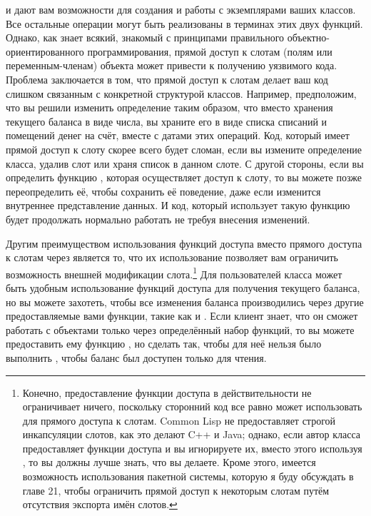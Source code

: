  и  дают вам возможности для создания и работы с
экземплярами ваших классов.  Все остальные операции могут быть реализованы в терминах этих
двух функций.  Однако, как знает всякий, знакомый с принципами правильного
объектно-ориентированного программирования, прямой доступ к слотам (полям или
переменным-членам) объекта может привести к получению уязвимого кода.  Проблема
заключается в том, что прямой доступ к слотам делает ваш код слишком связанным с
конкретной структурой классов.  Например, предположим, что вы решили изменить определение
 таким образом, что вместо хранения текущего баланса в виде числа, вы
храните его в виде списка списаний и помещений денег на счёт, вместе с датами этих
операций.  Код, который имеет прямой доступ к слоту  скорее всего будет
сломан, если вы измените определение класса, удалив слот или храня список в данном
слоте. С другой стороны, если вы определить функцию , которая осуществляет
доступ к слоту, то вы можете позже переопределить её, чтобы сохранить её поведение, даже
если изменится внутреннее представление данных.  И код, который использует такую функцию
будет продолжать нормально работать не требуя внесения изменений.

Другим преимуществом использования функций доступа вместо прямого доступа к слотам через
 является то, что их использование позволяет вам ограничить возможность
внешней модификации слота.\footnote{Конечно, предоставление функции доступа в
  действительности не ограничивает ничего, поскольку сторонний код все равно может
  использовать  для прямого доступа к слотам. Common Lisp не
  предоставляет строгой инкапсуляции слотов, как это делают C++ и Java; однако, если автор
  класса предоставляет функции доступа и вы игнорируете их, вместо этого используя
  , то вы должны лучше знать, что вы делаете.  Кроме этого, имеется
  возможность использования пакетной системы, которую я буду обсуждать в главе 21, чтобы
  ограничить прямой доступ к некоторым слотам путём отсутствия экспорта имён слотов.} Для
пользователей класса  может быть удобным использование функций доступа
для получения текущего баланса, но вы можете захотеть, чтобы все изменения баланса
производились через другие предоставляемые вами функции, такие как  и
.  Если клиент знает, что он сможет работать с объектами только через
определённый набор функций, то вы можете предоставить ему функцию , но
сделать так, чтобы для неё нельзя было выполнить , чтобы баланс был доступен
только для чтения.

